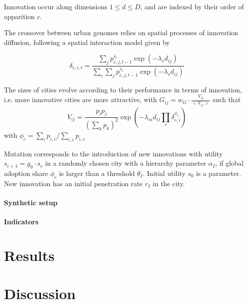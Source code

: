 \documentclass[letterpaper]{article}
\begin{document}


Innovation occur along dimensions $1 \leq d \leq D$, and are indexed by their order of apparition $c$.

The crossover between urban genomes relies on spatial processes of innovation diffusion, following a spatial interaction model given by

\[
\delta_{c,i,t} = \frac{\sum_j p_{c,j,t-1}^{s_c} \exp{(-\lambda_s d_{ij})}}{\sum_c \sum_j p_{c,j,t-1}^{s_c} \exp{(-\lambda_s d_{ij})}}
\]



The sizes of cities evolve according to their performance in terms of innovation, i.e. more innovative cities are more attractive, with $G_{ij} = w_G\cdot \frac{V_{ij}}{<V_{ij}>}$ such that
\[
V_{ij}= \frac{p_i p_j}{(\sum_k p_k)^2} \exp{(-\lambda_m d_{ij} \prod_c \delta_{c,i}^{\phi_c})}
\]
with $\phi_c = \sum_i p_{i,c}/\sum_{i,c} p_{i,c}$


Mutation corresponds to the introduction of new innovations with utility $s_{c+1} = g_0 \cdot s_c$ in a randomly chosen city with a hierarchy parameter $\alpha_I$, if global adoption share $\phi_c$ is larger than a threshold $\theta_I$. Initial utility $s_0$ is a parameter. New innovation has an initial penetration rate $r_I$ in the city.


\paragraph{Synthetic setup}



\paragraph{Indicators}



\section{Results}


\section{Discussion}




\footnotesize

\end{document}
